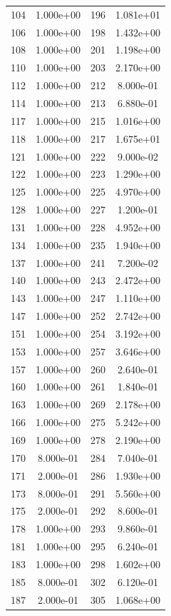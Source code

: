 \documentclass[12pt]{article}
\begin{document}
\begin{longtable}{@{}cccc@{}}
104 & 1.000e+00 & 196 & 1.081e+01 \\
106 & 1.000e+00 & 198 & 1.432e+00 \\
108 & 1.000e+00 & 201 & 1.198e+00 \\
110 & 1.000e+00 & 203 & 2.170e+00 \\
112 & 1.000e+00 & 212 & 8.000e-01 \\
114 & 1.000e+00 & 213 & 6.880e-01 \\
117 & 1.000e+00 & 215 & 1.016e+00 \\
118 & 1.000e+00 & 217 & 1.675e+01 \\
121 & 1.000e+00 & 222 & 9.000e-02 \\
122 & 1.000e+00 & 223 & 1.290e+00 \\
125 & 1.000e+00 & 225 & 4.970e+00 \\
128 & 1.000e+00 & 227 & 1.200e-01 \\
131 & 1.000e+00 & 228 & 4.952e+00 \\
134 & 1.000e+00 & 235 & 1.940e+00 \\
137 & 1.000e+00 & 241 & 7.200e-02 \\
140 & 1.000e+00 & 243 & 2.472e+00 \\
143 & 1.000e+00 & 247 & 1.110e+00 \\
147 & 1.000e+00 & 252 & 2.742e+00 \\
151 & 1.000e+00 & 254 & 3.192e+00 \\
153 & 1.000e+00 & 257 & 3.646e+00 \\
157 & 1.000e+00 & 260 & 2.640e-01 \\
160 & 1.000e+00 & 261 & 1.840e-01 \\
163 & 1.000e+00 & 269 & 2.178e+00 \\
166 & 1.000e+00 & 275 & 5.242e+00 \\
169 & 1.000e+00 & 278 & 2.190e+00 \\
170 & 8.000e-01 & 284 & 7.040e-01 \\
171 & 2.000e-01 & 286 & 1.930e+00 \\
173 & 8.000e-01 & 291 & 5.560e+00 \\
175 & 2.000e-01 & 292 & 8.600e-01 \\
178 & 1.000e+00 & 293 & 9.860e-01 \\
181 & 1.000e+00 & 295 & 6.240e-01 \\
183 & 1.000e+00 & 298 & 1.602e+00 \\
185 & 8.000e-01 & 302 & 6.120e-01 \\
187 & 2.000e-01 & 305 & 1.068e+00 \\

\end{longtable}
\end{document}
